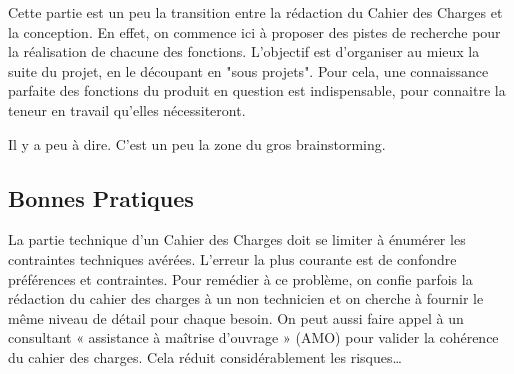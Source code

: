 Cette partie est un peu la transition entre la rédaction du Cahier des Charges et la conception. En effet, on commence ici à proposer des pistes de recherche pour la réalisation de chacune des fonctions.
L'objectif est d'organiser au mieux la suite du projet, en le découpant en "sous projets". Pour cela, une connaissance parfaite des fonctions du produit en question est indispensable, pour connaitre la teneur en travail qu'elles nécessiteront.

Il y a peu à dire. C'est un peu la zone du gros brainstorming.         


\subsection{Bonnes Pratiques}
La partie technique d’un Cahier des Charges doit se limiter à énumérer les contraintes techniques avérées.
L’erreur la plus courante est de confondre préférences et contraintes. 
Pour remédier à ce problème, on confie parfois la rédaction du cahier des charges à un non technicien et on cherche à fournir le même niveau de détail pour chaque besoin.
On peut aussi faire appel à un consultant « assistance à maîtrise d’ouvrage » (AMO) pour valider la cohérence du cahier des charges. Cela réduit considérablement les risques…
